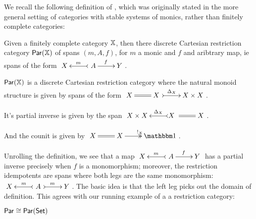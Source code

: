 \begin{theorem}
%
\end{theorem}
We recall the following definition of \cite[\S 3]{cockett}, which was originally stated in the more general setting of categories with stable systems of monics, rather than finitely complete categories:
\begin{definition}
Given a finitely complete category $\mathbb{X}$, then there discrete Cartesian restriction category $\mathsf{Par}(\mathbb{X})$ of spans $(m,A,f)$, for $m$ a monic and $f$ and aribtrary map, ie spans of the form
$
\xymatrix{
X 
&
\ A \ar@{>->}[l]_m \ar[r]^{f}
&
Y
}
$.

 $\mathsf{Par}(\mathbb{X})$ is a discrete Cartesian restriction category where the natural monoid structure is given by spans of the form 
$
\xymatrix{
X 
&
X \ \ar@{=}[l] \ar@{>->}[r]^{\Delta_X \ \ \ }
&
X\times X
}
$.


It's partial inverse is given by the span  
$
\xymatrix{
X \times X
&
X \ \ar@{=}[r] \ar@{>->}[l]_{\ \ \ \Delta_X}
&
X
}
$.

And the counit is given by 
$
\xymatrix{
X 
&
X \ar@{=}[l] \ar@{->>}[r]^{!_X}
&
\one
}
$.
\end{definition}
Unrolling the definition, we see that a map
$
\xymatrix{
X 
&
\ A  \ar@{>->}[l]_m \ar[r]^{f}
&
Y
}
$ 
has a partial inverse precisely when $f$ is a monomorphism; moreover, the restriction idempotents are spans where both legs are the same monomorphism:
$
\xymatrix{
X 
&
\ A\  \ar@{>->}[l]_m \ar@{>->}[r]^{m}
&
Y
}
$.
The basic idea is that the left leg picks out the domain of definition.  This agrees with our running example of a a restriction category:
\begin{example}
$\mathsf{Par}\cong\mathsf{Par}(\mathsf{Set})$
\end{example}
